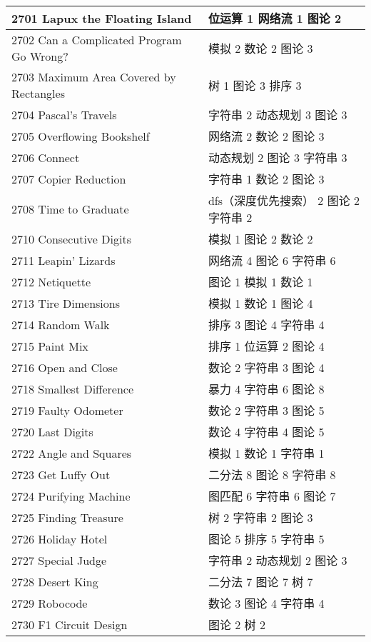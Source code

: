 \begin{longtable}{| p{} | p{} |}
 2701 Lapux the Floating Island  & 位运算 1 网络流 1 图论 2 \\ \hline
 2702 Can a Complicated Program Go Wrong?  & 模拟 2 数论 2 图论 3 \\ \hline
 2703 Maximum Area Covered by Rectangles  & 树 1 图论 3 排序 3 \\ \hline
 2704 Pascal's Travels  & 字符串 2 动态规划 3 图论 3 \\ \hline
 2705 Overflowing Bookshelf  & 网络流 2 数论 2 图论 3 \\ \hline
 2706 Connect  & 动态规划 2 图论 3 字符串 3 \\ \hline
 2707 Copier Reduction  & 字符串 1 数论 2 图论 3 \\ \hline
 2708 Time to Graduate  & dfs（深度优先搜索） 2 图论 2 字符串 2 \\ \hline
 2710 Consecutive Digits  & 模拟 1 图论 2 数论 2 \\ \hline
 2711 Leapin' Lizards  & 网络流 4 图论 6 字符串 6 \\ \hline
 2712 Netiquette  & 图论 1 模拟 1 数论 1 \\ \hline
 2713 Tire Dimensions  & 模拟 1 数论 1 图论 4 \\ \hline
 2714 Random Walk  & 排序 3 图论 4 字符串 4 \\ \hline
 2715 Paint Mix  & 排序 1 位运算 2 图论 4 \\ \hline
 2716 Open and Close  & 数论 2 字符串 3 图论 4 \\ \hline
 2718 Smallest Difference  & 暴力 4 字符串 6 图论 8 \\ \hline
 2719 Faulty Odometer  & 数论 2 字符串 3 图论 5 \\ \hline
 2720 Last Digits  & 数论 4 字符串 4 图论 5 \\ \hline
 2722 Angle and Squares  & 模拟 1 数论 1 字符串 1 \\ \hline
 2723 Get Luffy Out  & 二分法 8 图论 8 字符串 8 \\ \hline
 2724 Purifying Machine  & 图匹配 6 字符串 6 图论 7 \\ \hline
 2725 Finding Treasure  & 树 2 字符串 2 图论 3 \\ \hline
 2726 Holiday Hotel  & 图论 5 排序 5 字符串 5 \\ \hline
 2727 Special Judge  & 字符串 2 动态规划 2 图论 3 \\ \hline
 2728 Desert King  & 二分法 7 图论 7 树 7 \\ \hline
 2729 Robocode  & 数论 3 图论 4 字符串 4 \\ \hline
 2730 F1 Circuit Design  & 图论 2 树 2 \\ \hline

\end{longtable}
